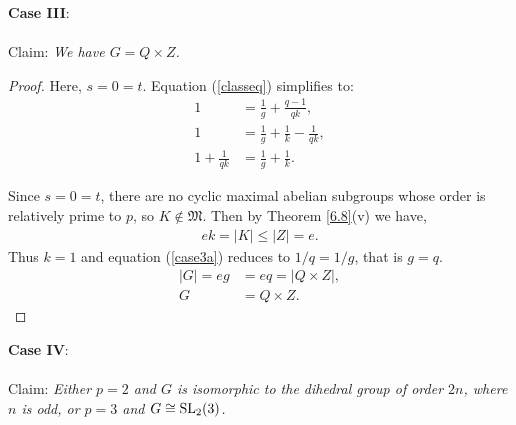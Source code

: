 \vspace{-1mm}
\textbf{Case III}:\\
\\
Claim: \textit{We have $G = Q \times Z$.}
\\
\begin{proof} Here, $s = 0 = t$. Equation (\ref{classeq}) simplifies to:
\begin{align}\label{case3a} 1 &= \frac{1}{g} + \frac{q-1}{qk}, \nonumber
\\ 1 &= \frac{1}{g} + \frac{1}{k} - \frac{1}{qk}, \nonumber
\\ 1 + \frac{1}{qk} &= \frac{1}{g} + \frac{1}{k}.
\end{align}

Since $s = 0 = t$, there are no cyclic maximal abelian subgroups whose order is relatively prime to $p$, so $K \not \in \mathfrak{M}$. Then by Theorem \ref{6.8}(v) we have,
\begin{align*} ek = |K| \leq |Z| = e.
\end{align*} 
Thus $k = 1$ and equation (\ref{case3a}) reduces to $1/q = 1/g$, that is $g=q$.
\begin{align*} |G| =  eg &= eq = |Q \times Z|,
\\ G &= Q \times Z.
\end{align*}
\qedhere
\end{proof}
\vspace{-1mm}
\textbf{Case IV}:\\
\\
Claim: \textit{Either $p=2$ and $G$ is isomorphic to the dihedral group of order $2n$, where $n$ is odd, or $p=3$ and $G \cong \operatorname{SL}_2(3)$.}
\\

